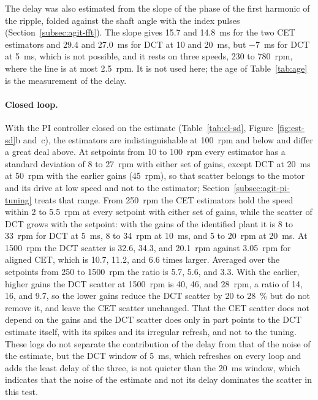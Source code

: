 The delay was also estimated from the slope of the phase of the first harmonic of the ripple, folded against the shaft angle with the index pulses (Section~\ref{subsec:agit-fft}). The slope gives 15.7 and 14.8~ms for the two CET estimators and 29.4 and 27.0~ms for DCT at 10 and 20~ms, but $-7$~ms for DCT at 5~ms, which is not possible, and it rests on three speeds, 230 to 780~rpm, where the line is at most 2.5~rpm. It is not used here; the age of Table~\ref{tab:age} is the measurement of the delay.

\paragraph{Closed loop.}
With the PI controller closed on the estimate (Table~\ref{tab:cl-sd}, Figure~\ref{fig:est-sd}b and~c), the estimators are indistinguishable at 100~rpm and below and differ a great deal above. At setpoints from 10 to 100~rpm every estimator has a standard deviation of 8 to 27~rpm with either set of gains, except DCT at 20~ms at 50~rpm with the earlier gains (45~rpm), so that scatter belongs to the motor and its drive at low speed and not to the estimator; Section~\ref{subsec:agit-pi-tuning} treats that range. From 250~rpm the CET estimators hold the speed within 2 to 5.5~rpm at every setpoint with either set of gains, while the scatter of DCT grows with the setpoint: with the gains of the identified plant it is 8 to 33~rpm for DCT at 5~ms, 8 to 34~rpm at 10~ms, and 5 to 20~rpm at 20~ms. At 1500~rpm the DCT scatter is 32.6, 34.3, and 20.1~rpm against 3.05~rpm for aligned CET, which is 10.7, 11.2, and 6.6 times larger. Averaged over the setpoints from 250 to 1500~rpm the ratio is 5.7, 5.6, and 3.3. With the earlier, higher gains the DCT scatter at 1500~rpm is 40, 46, and 28~rpm, a ratio of 14, 16, and 9.7, so the lower gains reduce the DCT scatter by 20 to 28~\% but do not remove it, and leave the CET scatter unchanged. That the CET scatter does not depend on the gains and the DCT scatter does only in part points to the DCT estimate itself, with its spikes and its irregular refresh, and not to the tuning. These logs do not separate the contribution of the delay from that of the noise of the estimate, but the DCT window of 5~ms, which refreshes on every loop and adds the least delay of the three, is not quieter than the 20~ms window, which indicates that the noise of the estimate and not its delay dominates the scatter in this test.

\begin{table}[htbp]
    \centering
    \caption[Closed-loop speed scatter by estimator, identified-plant gains]{Standard deviation of the raw speed (rpm) in the closed-loop staircase at 256 PPR with the gains from the identified plant, $K_p = 0.2482$ and $K_i = 6.8691$, 15~s per setpoint, one run per estimator. The results for the earlier gains, $K_p = 1.5641$ and $K_i = 41.2249$, are in Figure~\ref{fig:est-sd}c.}
    \label{tab:cl-sd}
    \small
    
\end{table}


